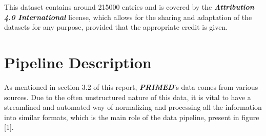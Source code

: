 \documentclass[sigconf]{acmart}
\begin{document}
This dataset contains around 215000 entries and is covered by the \textit{\textbf{Attribution 4.0 International}}\cite{ccfour} license, which allows for the sharing and adaptation of the datasets for any purpose, provided that the appropriate credit is given.

\section{Pipeline Description}

As mentioned in section 3.2 of this report, \textit{\textbf{PRIMED}}'s data comes from various sources. Due to the often unstructured nature of this data, it is vital to have a streamlined and automated way of normalizing and processing all the information into similar formats, which is the main role of the data pipeline, present in figure [1].
\end{document}
